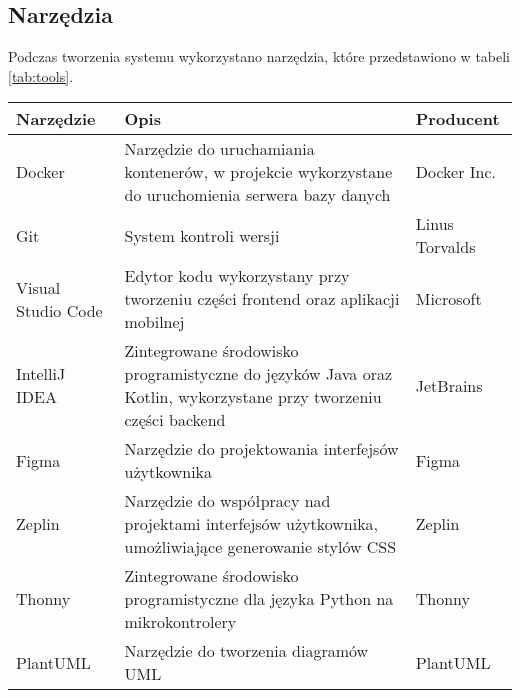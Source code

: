 \newpage

\subsection{Narzędzia}

Podczas tworzenia systemu wykorzystano narzędzia, które przedstawiono w tabeli \ref{tab:tools}.

\begin{tabularx}{\textwidth}{|l|X|l|}
    \caption{Narzędzia wykorzystane podczas tworzenia systemu}\label{tab:tools}                                                                                                   \\
    \hline
    \textbf{Narzędzie} & \textbf{Opis}                                                                                                                       & \textbf{Producent} \\
    \hline
    Docker             & Narzędzie do uruchamiania kontenerów, w projekcie wykorzystane do uruchomienia serwera bazy danych \cite{bib:docker}                & Docker Inc.        \\
    \hline
    Git                & System kontroli wersji \cite{bib:git}                                                                                               & Linus Torvalds     \\
    \hline
    Visual Studio Code & Edytor kodu wykorzystany przy tworzeniu części frontend oraz aplikacji mobilnej \cite{bib:vscode}                                   & Microsoft          \\
    \hline
    IntelliJ IDEA      & Zintegrowane środowisko programistyczne do języków Java oraz Kotlin, wykorzystane przy tworzeniu części backend \cite{bib:intellij} & JetBrains          \\
    \hline
    Figma              & Narzędzie do projektowania interfejsów użytkownika \cite{bib:figma}                                                                 & Figma              \\
    \hline
    Zeplin             & Narzędzie do współpracy nad projektami interfejsów użytkownika, umożliwiające generowanie stylów CSS \cite{bib:zeplin}              & Zeplin             \\
    \hline
    Thonny             & Zintegrowane środowisko programistyczne dla języka Python na mikrokontrolery \cite{bib:thonny}                                      & Thonny             \\
    \hline
    PlantUML           & Narzędzie do tworzenia diagramów UML \cite{bib:plantuml}                                                                            & PlantUML           \\
    \hline
\end{tabularx}


